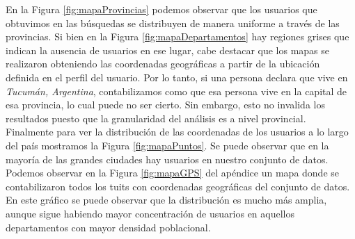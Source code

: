 En la Figura \ref{fig:mapaProvincias} podemos observar que los usuarios que obtuvimos en las búsquedas se distribuyen de manera uniforme a través de las provincias. Si bien en la Figura \ref{fig:mapaDepartamentos} hay regiones grises que indican la ausencia de usuarios en ese lugar, cabe destacar que los mapas se realizaron obteniendo las coordenadas geográficas a partir de la ubicación definida en el perfil del usuario. Por lo tanto, si una persona declara que vive en \textit{Tucumán, Argentina}, contabilizamos como que esa persona vive en la capital de esa provincia, lo cual puede no ser cierto. Sin embargo, esto no invalida los resultados puesto que la granularidad del análisis es a nivel provincial. Finalmente para ver la distribución de las coordenadas de los usuarios a lo largo del país mostramos la Figura \ref{fig:mapaPuntos}. Se puede observar que en la mayoría de las grandes ciudades hay usuarios en nuestro conjunto de datos. Podemos observar en la Figura \ref{fig:mapaGPS} del apéndice un mapa donde se contabilizaron todos los tuits con coordenadas geográficas del conjunto de datos. En este gráfico se puede observar que la distribución es mucho más amplia, aunque sigue habiendo mayor concentración de usuarios en aquellos departamentos con mayor densidad poblacional.



